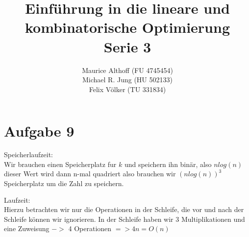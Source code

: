 \documentclass[a4paper,10pt,german]{scrartcl}
\title{Einführung in die lineare und kombinatorische Optimierung\\
Serie 3}
\author{Maurice Althoff (FU 4745454)\\Michael R. Jung (HU 502133)\\Felix Völker (TU 331834)}
\begin{document}
\maketitle

\section*{Aufgabe 9}
Speicherlaufzeit:\\

Wir brauchen einen Speicherplatz fur $k$ und speichern ihn bin\"ar, also $n log(n)$ dieser Wert wird dann n-mal quadriert also brauchen  wir $(n log(n))^3$ Speicherplatz um die Zahl zu speichern.

Laufzeit:\\

Hierzu betrachten wir nur die Operationen in der Schleife, die vor und nach der Schleife k\"onnen wir ignorieren. In der Schleife haben wir 3 Multiplikationen und eine Zuweisung $->$ 4 Operationen $=> 4n = O(n)$
\end{document}
